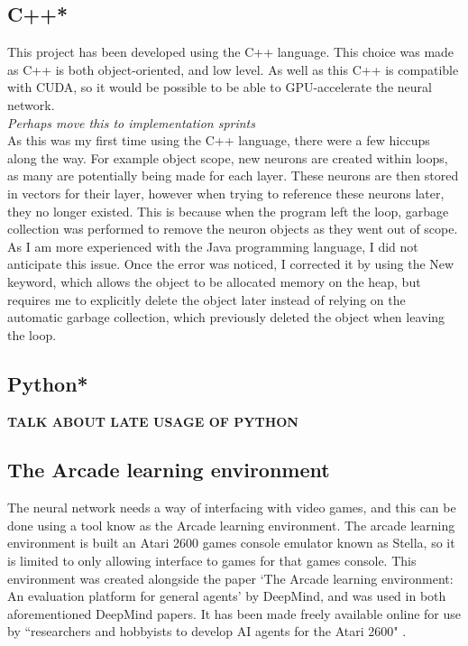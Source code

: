 \documentclass[10pt]{article}
\begin{document}
	\bigskip
	
	\subsection{C++*}
		This project has been developed using the C++ language. This choice was made as C++ is both object-oriented, and low level. As well as this C++ is compatible with CUDA, so it would be possible to be able to GPU-accelerate the neural network.\\
	
		\textit{Perhaps move this to implementation sprints}\\
		
		As this was my first time using the C++ language, there were a few hiccups along the way. For example object scope, new neurons are created within loops, as many are potentially being made for each layer. These neurons are then stored in vectors for their layer, however when trying to reference these neurons later, they no longer existed. This is because when the program left the loop, garbage collection was performed to remove the neuron objects as they went out of scope.\\
		
		As I am more experienced with the Java programming language, I did not anticipate this issue. Once the error was noticed, I corrected it by using the New keyword, which allows the object to be allocated memory on the heap, but requires me to explicitly delete the object later instead of relying on the automatic garbage collection, which previously deleted the object when leaving the loop.
	
	\bigskip
	
	\subsection{Python*}
	\textbf{TALK ABOUT LATE USAGE OF PYTHON}
	
	\bigskip
	
	\subsection{The Arcade learning environment}
	
		The neural network needs a way of interfacing with video games, and this can be done using a tool know as the Arcade learning environment. The arcade learning environment is built an Atari 2600 games console emulator known as Stella, so it is limited to only allowing interface to games for that games console. This environment was created alongside the paper `The Arcade learning environment: An evaluation platform for general agents' \cite{ale} by DeepMind, and was used in both aforementioned DeepMind papers. It has been made freely available online for use by ``researchers and hobbyists to develop AI agents for the Atari 2600" \cite{ale}.\\
		
\end{document}
